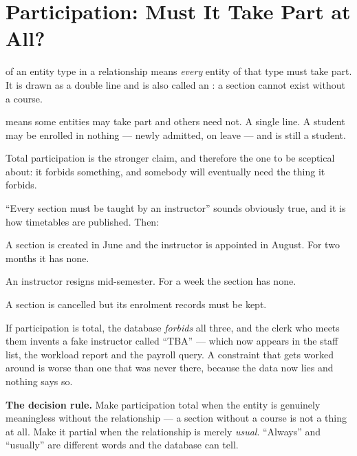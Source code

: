 \section{Participation: Must It Take Part at All?}

\begin{definitionbox}
 of an entity type in a relationship means
\emph{every} entity of that type must take part. It is drawn as a double line
and is also called an : a section cannot exist
without a course.

\smallskip
{} means some entities may take part and others need
not. A single line. A student may be enrolled in nothing --- newly admitted,
on leave --- and is still a student.

\smallskip
Total participation is the stronger claim, and therefore the one to be
sceptical about: it forbids something, and somebody will eventually need the
thing it forbids.
\end{definitionbox}

\begin{alertbox}
``Every section must be taught by an instructor'' sounds obviously true, and it
is how timetables are published. Then:

\begin{tight}
  \item A section is created in June and the instructor is appointed in August.
        For two months it has none.
  \item An instructor resigns mid-semester. For a week the section has none.
  \item A section is cancelled but its enrolment records must be kept.
\end{tight}

\smallskip
If participation is total, the database \emph{forbids} all three, and the clerk
who meets them invents a fake instructor called ``TBA'' --- which now appears
in the staff list, the workload report and the payroll query. A constraint
that gets worked around is worse than one that was never there, because the
data now lies and nothing says so.

\smallskip
\textbf{The decision rule.} Make participation total when the entity is
genuinely meaningless without the relationship --- a section without a course
is not a thing at all. Make it partial when the relationship is merely
\emph{usual}. ``Always'' and ``usually'' are different words and the database
can tell.
\end{alertbox}


